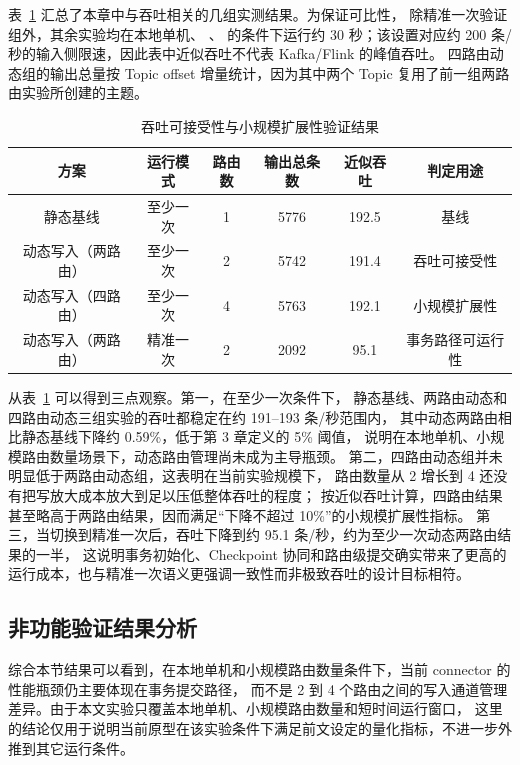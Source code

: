 表~\ref{tab:throughput-results} 汇总了本章中与吞吐相关的几组实测结果。为保证可比性，
除精准一次验证组外，其余实验均在本地单机、\allowbreak
{}、\allowbreak
{} 的条件下运行约 30 秒；该设置对应约 200 条/秒的输入侧限速，因此表中近似吞吐不代表 Kafka/Flink 的峰值吞吐。
四路由动态组的输出总量按 Topic offset 增量统计，因为其中两个 Topic 复用了前一组两路由实验所创建的主题。

\begin{table}[htbp]
  \centering
  \caption{吞吐可接受性与小规模扩展性验证结果}
  \label{tab:throughput-results}
  \begin{tabular}{cccccc}
    \toprule
    方案 & 运行模式 & 路由数 & 输出总条数 & 近似吞吐 & 判定用途 \\
    \midrule
    静态基线 & 至少一次 & 1 & 5776 & 192.5 & 基线 \\
    动态写入（两路由） & 至少一次 & 2 & 5742 & 191.4 & 吞吐可接受性 \\
    动态写入（四路由） & 至少一次 & 4 & 5763 & 192.1 & 小规模扩展性 \\
    动态写入（两路由） & 精准一次 & 2 & 2092 & 95.1 & 事务路径可运行性 \\
    \bottomrule
  \end{tabular}
\end{table}

从表~\ref{tab:throughput-results} 可以得到三点观察。第一，在至少一次条件下，
静态基线、两路由动态和四路由动态三组实验的吞吐都稳定在约 191--193 条/秒范围内，
其中动态两路由相比静态基线下降约 0.59\%，低于第 3 章定义的 5\% 阈值，
说明在本地单机、小规模路由数量场景下，动态路由管理尚未成为主导瓶颈。
第二，四路由动态组并未明显低于两路由动态组，这表明在当前实验规模下，
路由数量从 2 增长到 4 还没有把写放大成本放大到足以压低整体吞吐的程度；
按近似吞吐计算，四路由结果甚至略高于两路由结果，因而满足“下降不超过 10\%”的小规模扩展性指标。
第三，当切换到精准一次后，吞吐下降到约 95.1 条/秒，约为至少一次动态两路由结果的一半，
这说明事务初始化、Checkpoint 协同和路由级提交确实带来了更高的运行成本，也与精准一次语义更强调一致性而非极致吞吐的设计目标相符。

\subsection{非功能验证结果分析}

综合本节结果可以看到，在本地单机和小规模路由数量条件下，当前 connector 的性能瓶颈仍主要体现在事务提交路径，
而不是 2 到 4 个路由之间的写入通道管理差异。由于本文实验只覆盖本地单机、小规模路由数量和短时间运行窗口，
这里的结论仅用于说明当前原型在该实验条件下满足前文设定的量化指标，不进一步外推到其它运行条件。

